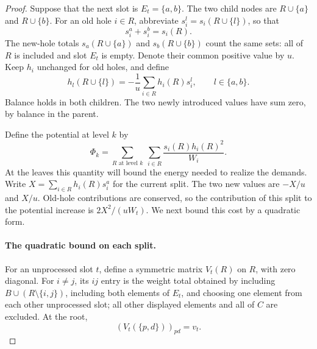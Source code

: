 \documentclass[11pt]{article}
\theoremstyle{definition}
\begin{document}
\begin{proof}
Suppose that the next slot is $E_t=\{a,b\}$.  The two child nodes are
$R\cup\{a\}$ and $R\cup\{b\}$.  For an old hole $i\in R$, abbreviate
$s_i^l=s_i(R\cup\{l\})$, so that
\[
 s_i^a+s_i^b=s_i(R).
\]
The new-hole totals $s_a(R\cup\{a\})$ and $s_b(R\cup\{b\})$ count the
same sets: all of $R$ is included and slot $E_t$ is empty.  Denote their
common positive value by $u$.  Keep $h_i$ unchanged for old holes, and define
\begin{equation}\label{eq:newhole}
 h_l(R\cup\{l\})=-\frac1u\sum_{i\in R}h_i(R)s_i^l,
 \qquad l\in\{a,b\}.
\end{equation}
Balance holds in both children.  The two newly introduced values have
sum zero, by balance in the parent.

Define the potential at level $k$ by
\[
 \Phi_k=\sum_{R\text{ at level }k}\ \sum_{i\in R}
                 \frac{s_i(R)h_i(R)^2}{W_i}.
\]
At the leaves this quantity will bound the energy needed to realize the
demands.  Write $X=\sum_{i\in R}h_i(R)s_i^a$ for the current split.
The two new values are $-X/u$ and $X/u$.  Old-hole contributions are
conserved, so the contribution of this split to the potential increase
is $2X^2/(uW_t)$.  We next bound this cost by a quadratic form.

\paragraph{The quadratic bound on each split.}
For an unprocessed slot $t$, define a symmetric matrix $V_t(R)$ on $R$,
with zero diagonal.  For $i\ne j$, its $ij$ entry is the weight total
obtained by including $B\cup(R\setminus\{i,j\})$, including both
elements of $E_t$, and choosing one element from each other unprocessed
slot; all other displayed elements and all of $C$ are excluded.
At the root,
\begin{equation}\label{eq:rootV}
 (V_t(\{p,d\}))_{pd}=v_t.
\end{equation}


\end{proof}
\end{document}
